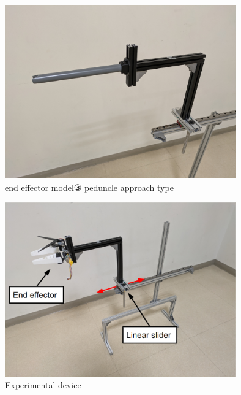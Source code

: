 \begin{figure}[H]
    \centering
    \includegraphics[width=100mm]{images/png/agrist_model.png}
    \caption{end effector model③ peduncle approach type}
    \label{Fig:agristmodel}
   \end{figure}

\begin{figure}[H]
    \centering
    \includegraphics[width=100mm]{images/png/device.png}
    \caption{Experimental device}
    \label{Fig:device}
   \end{figure}
